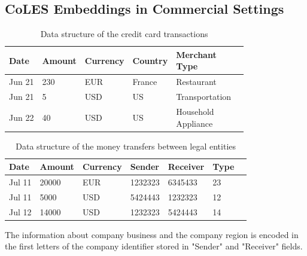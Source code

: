 \documentclass[sigconf, anonymous]{acmart}
\begin{document}
\subsection{CoLES Embeddings in Commercial Settings}

\begin{table}
\centering
\caption{Data structure of the credit card transactions}
\begin{tabular}{llllll}
\toprule
\textbf{Date} & \textbf{Amount} & \textbf{Currency} & \textbf{Country} & \makecell{\textbf{Merchant} \\ \textbf{Type}} \\
\midrule
Jun 21 & 230 & EUR & France & Restaurant \\
Jun 21 & 5 & USD & US & Transportation \\
Jun 22 & 40 & USD & US & \makecell[l]{Household \\ Appliance} \\
\bottomrule
\end{tabular}
\label{tab-tr-data}
\end{table}


\begin{table}
\centering
\caption{Data structure of the money transfers between legal entities}
\begin{tabular}{lllllll}
\toprule
\textbf{Date} & \textbf{Amount} & \textbf{Currency} & \textbf{Sender} & \textbf{Receiver} & \textbf{Type} \\
\midrule
Jul 11 & 20000 & EUR & 1232323 & 6345433 & 23 \\
Jul 11 & 5000 & USD & 5424443 & 1232323 & 12 \\
Jul 12 & 14000 & USD & 1232323 & 5424443 & 14 \\
\bottomrule
\end{tabular}
\small{The information about company business and the company region is encoded in the first letters of the company identifier stored in "Sender" and "Receiver" fields.}
\label{tab-org-tr-data}
\end{table}
\end{document}
